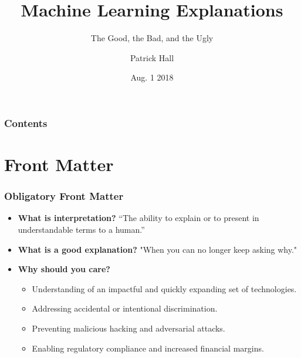 \documentclass[11pt,
               aspectratio=169
               ]{beamer}
\author{Patrick Hall}
\title{Machine Learning Explanations}
\subtitle{The Good, the Bad, and the Ugly}
\institute{\href{https://www.h2o.ai}{H\textsubscript{2}O.ai}}
\date{Aug. 1 2018}
\begin{document}
	
	\maketitle
	
	\begin{frame}
	
		\frametitle{Contents}
		
		\tableofcontents{}
		
	\end{frame}

	\section{Front Matter}
	
		\begin{frame}
		
			\frametitle{Obligatory Front Matter}
			
				\begin{itemize}
					
					\item \textbf{What is interpretation?} “The	ability	to explain or to present in understandable terms to	a human.” \cite{been_kim1}
					
					\item \textbf{What is a good explanation?} "When you can no longer keep asking why." \cite{gilpin2018explaining}
					
					\item \textbf{Why should you care?}
					\begin{itemize}
						\item Understanding of an impactful and quickly expanding set of technologies. 
						\item Addressing accidental or intentional discrimination.
						\item Preventing malicious hacking and adversarial attacks.
						\item Enabling regulatory compliance and increased financial margins.
					\end{itemize}
					
				\end{itemize}
			
		\end{frame}

\end{document}
